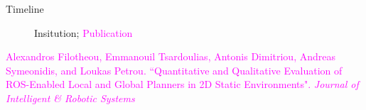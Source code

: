 \begin{frame}{Timeline}

\begin{figure}[t!] \centering
        
        \caption{\textcolor[RGB]{32,74,135}{Insitution}; \textcolor{magenta}{Publication}}
\end{figure}

  \placebottom \tiny
\textcolor{magenta}{Alexandros Filotheou, Emmanouil Tsardoulias, Antonis Dimitriou, Andreas Symeonidis, and
Loukas Petrou. ``Quantitative and Qualitative Evaluation of ROS-Enabled Local and Global Planners in
2D Static Environments". \textit{Journal of Intelligent \& Robotic Systems}}

\end{frame}
